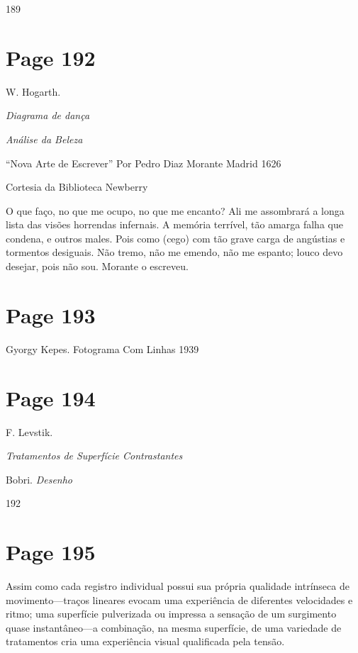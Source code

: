 \documentclass[a4paper]{article}
\begin{document}
\begin{center}
189
\end{center}

\newpage
\section*{Page 192}

W. Hogarth.

\itshape Diagrama de dança \par
\itshape Análise da Beleza \par

\bigskip

``Nova Arte de Escrever'' Por Pedro Diaz Morante Madrid 1626 \par
Cortesia da Biblioteca Newberry \par

\bigskip

O que faço, no que me ocupo, no que me encanto? Ali me assombrará a longa lista das visões horrendas infernais. A memória terrível, tão amarga falha que condena, e outros males. Pois como (cego) com tão grave carga de angústias e tormentos desiguais. Não tremo, não me emendo, não me espanto; louco devo desejar, pois não sou. Morante o escreveu.

\newpage
\section*{Page 193}

\noindent Gyorgy Kepes. Fotograma Com Linhas 1939

\newpage
\section*{Page 194}

F. Levstik.

\textit{Tratamentos de Superfície Contrastantes}



Bobri. \textit{Desenho}



\begin{center}
192
\end{center}

\newpage
\section*{Page 195}

Assim como cada registro individual possui sua própria qualidade intrínseca de movimento---traços lineares evocam uma experiência de diferentes velocidades e ritmo; uma superfície pulverizada ou impressa a sensação de um surgimento quase instantâneo---a combinação, na mesma superfície, de uma variedade de tratamentos cria uma experiência visual qualificada pela tensão.
\end{document}
